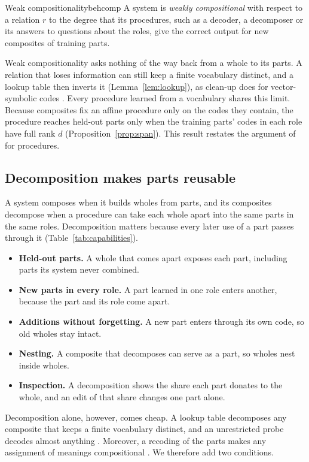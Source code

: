 \documentclass[10pt]{article}
\theoremstyle{plain}
\theoremstyle{remark}
\begin{document}
\begin{defbox}{Weak compositionality}{behcomp}
A system is \emph{weakly compositional} with respect to a relation $r$ to the degree that its procedures, such as a decoder, a decomposer or its answers to questions about the roles, give the correct output for new composites of training parts.
\end{defbox}

Weak compositionality asks nothing of the way back from a whole to its parts. A relation that loses information can still keep a finite vocabulary distinct, and a lookup table then inverts it (Lemma~\ref{lem:lookup}), as clean-up does for vector-symbolic codes \citep{plate1995}. Every procedure learned from a vocabulary shares this limit. Because composites fix an affine procedure only on the codes they contain, the procedure reaches held-out parts only when the training parts' codes in each role have full rank $d$ (Proposition~\ref{prop:span}). This result restates the argument of \citet{marcus1998} for procedures.

\subsection{Decomposition makes parts reusable}
\label{sec:decomposition}

A system composes when it builds wholes from parts, and its composites decompose when a procedure can take each whole apart into the same parts in the same roles. Decomposition matters because every later use of a part passes through it (Table~\ref{tab:capabilities}).
\begin{itemize}
  \item \textbf{Held-out parts.} A whole that comes apart exposes each part, including parts its system never combined.
  \item \textbf{New parts in every role.} A part learned in one role enters another, because the part and its role come apart.
  \item \textbf{Additions without forgetting.} A new part enters through its own code, so old wholes stay intact.
  \item \textbf{Nesting.} A composite that decomposes can serve as a part, so wholes nest inside wholes.
  \item \textbf{Inspection.} A decomposition shows the share each part donates to the whole, and an edit of that share changes one part alone.
\end{itemize}

Decomposition alone, however, comes cheap. A lookup table decomposes any composite that keeps a finite vocabulary distinct, and an unrestricted probe decodes almost anything \citep{hewitt2019}. Moreover, a recoding of the parts makes any assignment of meanings compositional \citep{zadrozny1994}. We therefore add two conditions.
\end{document}
